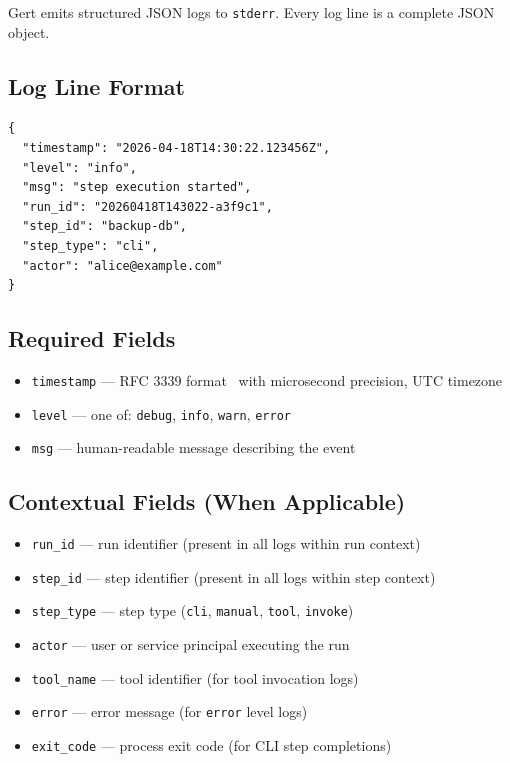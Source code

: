 Gert emits structured JSON logs to \texttt{stderr}. Every log line is a complete JSON object.

\subsection{Log Line Format}

\begin{verbatim}
{
  "timestamp": "2026-04-18T14:30:22.123456Z",
  "level": "info",
  "msg": "step execution started",
  "run_id": "20260418T143022-a3f9c1",
  "step_id": "backup-db",
  "step_type": "cli",
  "actor": "alice@example.com"
}
\end{verbatim}

\subsection{Required Fields}

\begin{itemize}
  \item \texttt{timestamp} — RFC 3339 format~\cite{rfc3339} with microsecond precision, UTC timezone
  \item \texttt{level} — one of: \texttt{debug}, \texttt{info}, \texttt{warn}, \texttt{error}
  \item \texttt{msg} — human-readable message describing the event
\end{itemize}

\subsection{Contextual Fields (When Applicable)}

\begin{itemize}
  \item \texttt{run\_id} — run identifier (present in all logs within run context)
  \item \texttt{step\_id} — step identifier (present in all logs within step context)
  \item \texttt{step\_type} — step type (\texttt{cli}, \texttt{manual}, \texttt{tool}, \texttt{invoke})
  \item \texttt{actor} — user or service principal executing the run
  \item \texttt{tool\_name} — tool identifier (for tool invocation logs)
  \item \texttt{error} — error message (for \texttt{error} level logs)
  \item \texttt{exit\_code} — process exit code (for CLI step completions)
\end{itemize}

